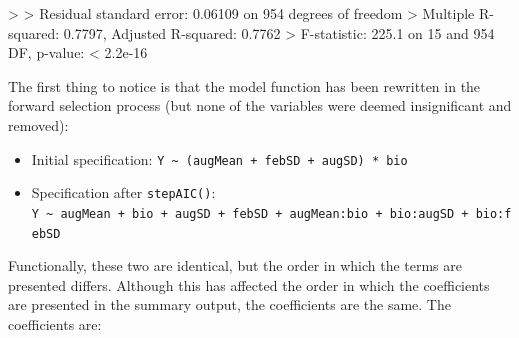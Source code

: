 \documentclass[
  letterpaper,
]{book}
\newenvironment{Shaded}{\begin{snugshade}}{\end{snugshade}}
\newcommand{\DecValTok}[1]{\textcolor[rgb]{0.68,0.00,0.00}{#1}}
\newcommand{\ErrorTok}[1]{\textcolor[rgb]{0.68,0.00,0.00}{#1}}
\newcommand{\FloatTok}[1]{\textcolor[rgb]{0.68,0.00,0.00}{#1}}
\newcommand{\NormalTok}[1]{\textcolor[rgb]{0.00,0.23,0.31}{#1}}
\newcommand{\SpecialCharTok}[1]{\textcolor[rgb]{0.37,0.37,0.37}{#1}}
\providecommand{\tightlist}{%
  \setlength{\itemsep}{0pt}\setlength{\parskip}{0pt}}\usepackage{longtable,booktabs,array}
\begin{document}
\begin{Shaded}
\begin{Highlighting}[]
\SpecialCharTok{\textgreater{}} 
\ErrorTok{\textgreater{}}\NormalTok{ Residual standard error}\SpecialCharTok{:} \FloatTok{0.06109}\NormalTok{ on }\DecValTok{954}\NormalTok{ degrees of freedom}
\SpecialCharTok{\textgreater{}}\NormalTok{ Multiple R}\SpecialCharTok{{-}}\NormalTok{squared}\SpecialCharTok{:}  \FloatTok{0.7797}\NormalTok{,  Adjusted R}\SpecialCharTok{{-}}\NormalTok{squared}\SpecialCharTok{:}  \FloatTok{0.7762} 
\SpecialCharTok{\textgreater{}}\NormalTok{ F}\SpecialCharTok{{-}}\NormalTok{statistic}\SpecialCharTok{:} \FloatTok{225.1}\NormalTok{ on }\DecValTok{15}\NormalTok{ and }\DecValTok{954}\NormalTok{ DF,  p}\SpecialCharTok{{-}}\NormalTok{value}\SpecialCharTok{:} \ErrorTok{\textless{}} \FloatTok{2.2e{-}16}
\end{Highlighting}
\end{Shaded}

The first thing to notice is that the model function has been rewritten
in the forward selection process (but none of the variables were deemed
insignificant and removed):

\begin{itemize}
\tightlist
\item
  Initial specification:
  \texttt{Y\ \textasciitilde{}\ (augMean\ +\ febSD\ +\ augSD)\ *\ bio}
\item
  Specification after \texttt{stepAIC()}:
  \texttt{Y\ \textasciitilde{}\ augMean\ +\ bio\ +\ augSD\ +\ febSD\ +\ augMean:bio\ +\ bio:augSD\ +\ bio:febSD}
\end{itemize}

Functionally, these two are identical, but the order in which the terms
are presented differs. Although this has affected the order in which the
coefficients are presented in the summary output, the coefficients are
the same. The coefficients are:
\end{document}
